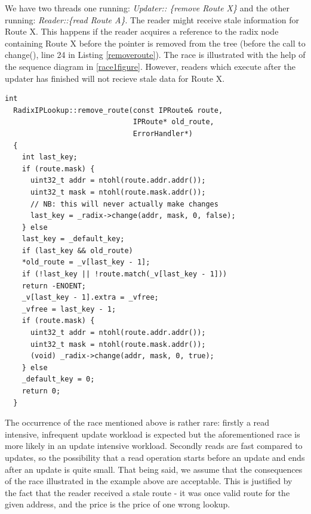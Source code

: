 \documentclass{article}
\begin{document}
We have two threads one running: \emph{Updater:: \{remove Route X\}} and the other running: \emph{Reader::\{read Route A\}}. The reader might receive stale information for Route X. This happens if the reader acquires a reference to the radix node containing Route X before the pointer is removed from the tree (before the call to change(), line 24 in Listing \ref{removeroute}). The race is illustrated with the help of the sequence diagram in \ref{race1figure}. However, readers which execute after the updater has finished will not recieve stale data for Route X.
\begin{lstlisting}[caption= The remove\_route() function, label=removeroute]
  int
  RadixIPLookup::remove_route(const IPRoute& route, 
                              IPRoute* old_route, 
                              ErrorHandler*)
  {
    int last_key;
    if (route.mask) {
      uint32_t addr = ntohl(route.addr.addr());
      uint32_t mask = ntohl(route.mask.addr());
      // NB: this will never actually make changes
      last_key = _radix->change(addr, mask, 0, false);
    } else
    last_key = _default_key;
    if (last_key && old_route)
    *old_route = _v[last_key - 1];
    if (!last_key || !route.match(_v[last_key - 1]))
    return -ENOENT;
    _v[last_key - 1].extra = _vfree;
    _vfree = last_key - 1;
    if (route.mask) {
      uint32_t addr = ntohl(route.addr.addr());
      uint32_t mask = ntohl(route.mask.addr());
      (void) _radix->change(addr, mask, 0, true);
    } else
    _default_key = 0;
    return 0;
  }
\end{lstlisting}
The occurrence of the race mentioned above is rather rare: firstly a read intensive, infrequent update workload is expected but the aforementioned race is more likely in an update intensive workload. Secondly reads are fast compared to updates, so the possibility that a read operation starts before an update and ends after an update is quite small. That being said, we assume that the consequences of the race illustrated in the example above are acceptable. This is justified by the fact that the reader received a stale route - it was once valid route for the given address, and the price is the price of one wrong lookup.
\end{document}
